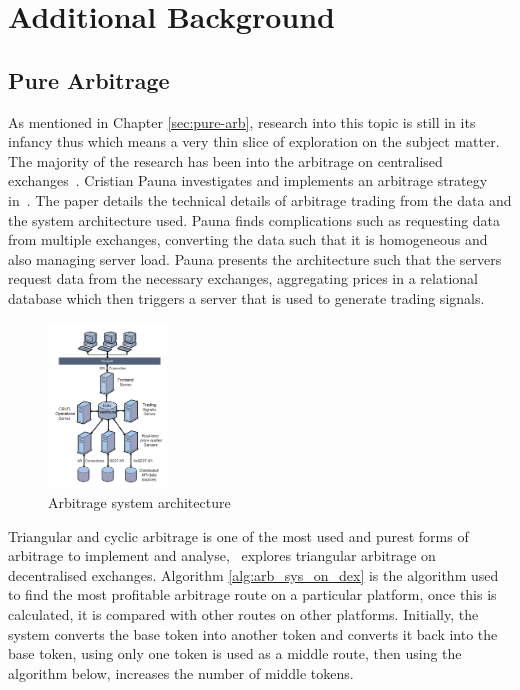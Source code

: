 \appendix
\chapter{Additional Background}
\section{Pure Arbitrage}
\label{appendix:add-background-pure-arb}
As mentioned in Chapter \ref{sec:pure-arb}, research into this topic is still in its infancy thus which means a very thin slice of exploration on the subject matter. The majority of the research has been into the arbitrage on centralised exchanges~\cite{MakarovIgor2020Taai, crepelliere_arbitrage_2022, PAUNACristian2018ATSf}. Cristian Pauna investigates and implements an arbitrage strategy in~\cite{PAUNACristian2018ATSf}. The paper details the technical details of arbitrage trading from the data and the system architecture used. Pauna finds complications such as requesting data from multiple exchanges, converting the data such that it is homogeneous and also managing server load. Pauna presents the architecture such that the servers request data from the necessary exchanges, aggregating prices in a relational database which then triggers a server that is used to generate trading signals.
\\[3mm]
\begin{figure}[!htb]
    \centering
    \includegraphics[width=0.28\textwidth]{background/Images/Arbitrage-Architecture.png}
    \caption{Arbitrage system architecture~\cite{PAUNACristian2018ATSf}}
\end{figure}

\noindent Triangular and cyclic arbitrage is one of the most used and purest forms of arbitrage to implement and analyse,~\cite{boonpeam2021arbitrage} explores triangular arbitrage on decentralised exchanges. Algorithm \ref{alg:arb_sys_on_dex} is the algorithm used to find the most profitable arbitrage route on a particular platform, once this is calculated, it is compared with other routes on other platforms. Initially, the system converts the base token into another token and converts it back into the base token, using only one token is used as a middle route, then using the algorithm below, increases the number of middle tokens.
\\[3mm]

